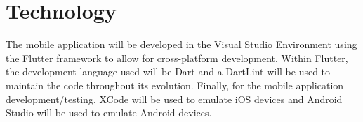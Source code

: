 \documentclass{article}
\begin{document}



\section{Technology}

The mobile application will be developed in the Visual Studio Environment using the Flutter framework to allow for cross-platform development.  Within Flutter, the development language used will be Dart and a DartLint will be used to maintain the code throughout its evolution.  Finally, for the mobile application development/testing, XCode will be used to emulate iOS devices and Android Studio will be used to emulate Android devices. 
\end{document}
